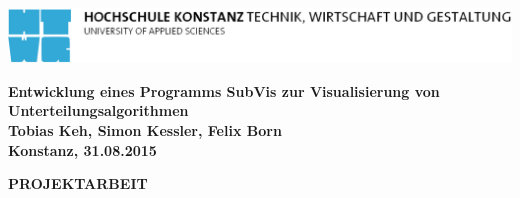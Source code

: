 \begin{titlepage}

\vspace*{-3.5cm}

\begin{flushleft}
\hspace*{-1cm} \includegraphics[width=15.7cm]{content/media/htwg-logo}
\end{flushleft}

\vspace{2.5cm}

\begin{center}
	\huge{
		\textbf{Entwicklung eines Programms SubVis zur Visualisierung von Unterteilungsalgorithmen} \\[5cm]
	}
	\Large{
		\textbf{Tobias Keh, Simon Kessler, Felix Born}} \\[6.5cm]
	\large{
		\textbf{Konstanz, 31.08.2015} \\[2.3cm]
	}
	
	\Huge{
		\textbf{{\sf PROJEKTARBEIT}}
	}
\end{center}

\end{titlepage}